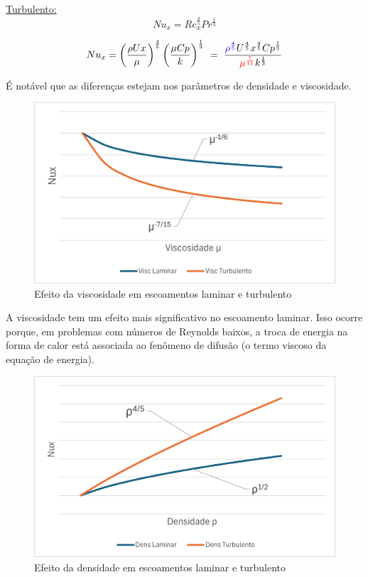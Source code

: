 \documentclass[12pt]{article}
\begin{document}
\underline{Turbulento:}
\begin{equation}
	Nu_x= Re^\frac{4}{5}_x Pr^\frac{1}{3}	
\end{equation}

\begin{equation}
	Nu_x= \left( \frac{\rho Ux}{\mu}\right)^\frac{4}{5}      \left( \frac{\mu Cp}{k}\right)^{\frac{1}{3}} \ = \ \frac{\textcolor{blue}{\rho^\frac{4}{5} }  U^\frac{4}{5} x^\frac{4}{5}    Cp^\frac{1}{3}	}{ {\textcolor{red}{\mu^\frac{7}{15}}}  k^\frac{1}{3}}
\end{equation}

É notável que as diferenças estejam nos parâmetros de densidade e viscosidade.

\begin{figure}[H]
	\centering
	\includegraphics[width=.65\textwidth]{figures/2}
	\caption{Efeito da viscosidade em escoamentos laminar e turbulento}
\end{figure}

A viscosidade tem um efeito mais significativo no escoamento laminar. Isso ocorre porque, em problemas com números de Reynolds baixos, a troca de energia na forma de calor está associada ao fenômeno de difusão (o termo viscoso da equação de energia).

\begin{figure}[H]
	\centering
	\includegraphics[width=.65\textwidth]{figures/3}
	\caption{Efeito da densidade em escoamentos laminar e turbulento}
\end{figure}
\end{document}
